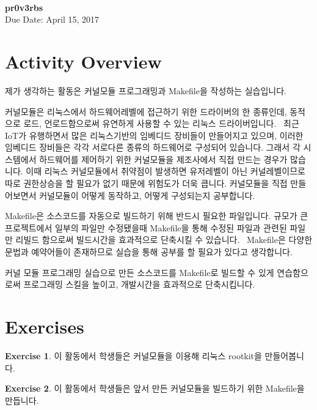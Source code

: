 \documentclass[a4paper, 11pt]{article}
\theoremstyle{definition}
\newtheorem{exercise}{Exercise}
\begin{document}
 \\
         {\phantom{} \hfill \textbf{pr0v3rbs}} \\
         {\phantom{} \hfill Due Date: April 15, 2017} \\

\section{Activity Overview}

제가 생각하는 활동은 커널모듈 프로그래밍과 Makefile을 작성하는 실습입니다.

커널모듈은 리눅스에서 하드웨어레벨에 접근하기 위한 드라이버의 한 종류인데,
동적으로 로드, 언로드함으로써 유연하게 사용할 수 있는 리눅스 드라이버입니다.~\cite{loadablekernelmodule}
최근 IoT가 유행하면서 많은 리눅스기반의 임베디드 장비들이 만들어지고 있으며,
이러한 임베디드 장비들은 각각 서로다른 종류의 하드웨어로 구성되어 있습니다.
그래서 각 시스템에서 하드웨어를 제어하기 위한 커널모듈을 제조사에서 직접 만드는 경우가 많습니다.
이때 리눅스 커널모듈에서 취약점이 발생하면 유저레벨이 아닌 커널레벨이므로 따로 권한상승을 할 필요가 없기 때문에 위험도가 더욱 큽니다.
커널모듈을 직접 만들어보면서 커널모듈이 어떻게 동작하고, 어떻게 구성되는지 공부합니다.

Makefile은 소스코드를 자동으로 빌드하기 위해 반드시 필요한 파일입니다.
규모가 큰 프로젝트에서 일부의 파일만 수정됐을때 Makefile을 통해 수정된 파일과
관련된 파일만 리빌드 함으로써 빌드시간을 효과적으로 단축시킬 수 있습니다.~\cite{makefilewiki}
Makefile은 다양한 문법과 예약어들이 존재하므로 실습을 통해 공부를 할 필요가 있다고 생각합니다.

커널 모듈 프로그래밍 실습으로 만든 소스코드를 Makefile로 빌드할 수 있게 연습함으로써 
프로그래밍 스킬을 높이고, 개발시간을 효과적으로 단축시킵니다.

\section{Exercises}

\begin{exercise}

  이 활동에서 학생들은 커널모듈을 이용해 리눅스 rootkit을 만들어봅니다.

\end{exercise}

\begin{exercise}

  이 활동에서 학생들은 앞서 만든 커널모듈을 빌드하기 위한 Makefile을 만듭니다.

\end{exercise}
\end{document}
